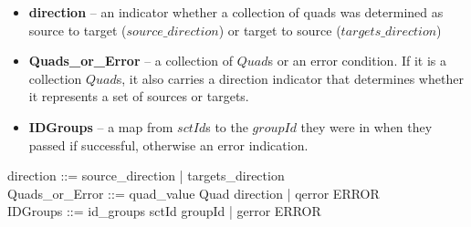 \documentclass{article}
\begin{document}
\begin{itemize}[noitemsep,nolistsep]
\item \textbf{direction} -- an indicator whether a collection of quads was determined as source to target ($source\_direction$) or target to source ($targets\_direction$)
\item \textbf{Quads\_or\_Error} --  a collection of $Quad$s or an error condition. If it is a collection $Quad$s, it also carries
a direction indicator that determines whether it represents a set of sources or targets. 
\item \textbf{IDGroups} -- a map from $sctId$s to the $groupId$ they were in when they passed if successful, otherwise an error indication.
\end{itemize}

\begin{zed}
direction ::= source\_direction | targets\_direction \\
Quads\_or\_Error ::= quad\_value \ldata \power Quad \cross direction \rdata | qerror \ldata ERROR \rdata \\
\also
IDGroups ::= id\_groups \ldata sctId \pfun \power groupId \rdata | gerror \ldata ERROR \rdata
\end{zed}
\end{document}
